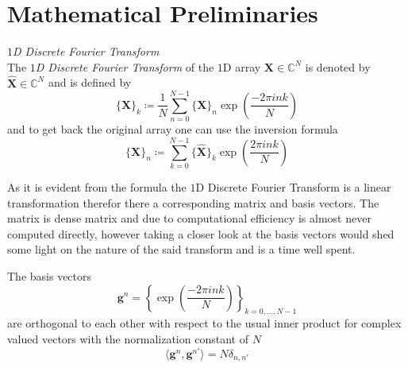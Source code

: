 \chapter{Mathematical Preliminaries}






\begin{Def}\label{def:1ddft}
    \emph{$1$D Discrete Fourier Transform}\\
    The \emph{$1$D Discrete Fourier Transform} of the $1$D array $\boldsymbol{X} \in \mathbb{C}^{N}$ is denoted by 
    $\hat {\boldsymbol{X}} \in \mathbb{C}^{N}$ and is defined by
    \begin{equation}\label{eq:1ddft}
        \{\hat {\boldsymbol{X}}\}_{k} \coloneqq \frac{1}{N}\sum_{n=0}^{N-1} \{{\boldsymbol{X}}\}_{n}\exp\left({\frac{-2\pi ink}{N}}\right)
    \end{equation}
    and to get back the original array one can use the inversion formula
    \begin{equation}\label{eq:1didft}
        \{{\boldsymbol{X}}\}_{n} \coloneqq \sum_{k=0}^{N-1}\{\hat {\boldsymbol{X}}\}_{k}\exp\left({\frac{2\pi ink}{N}}\right)
    \end{equation}    
\end{Def}

As it is evident from the formula the $1$D Discrete Fourier Transform is a linear transformation therefor 
there a corresponding matrix and basis vectors. The matrix is dense matrix and due to computational efficiency 
is almost never computed directly, however taking a closer look at the basis vectors would shed some light on 
the nature of the said transform and is a time well spent.

\begin{Prop}\label{Prop:1ddftbasisvectors}
    The basis vectors
    \begin{equation}\label{eq:1ddftbasisvectors}
        \boldsymbol{g}^n = \left\{\exp\left({\frac{-2\pi ink}{N}}\right)\right\}_{k=0,\ldots,N-1}
    \end{equation}
    are orthogonal to each other with respect to the usual inner product for complex valued vectors 
    with the normalization constant of $N$
    \begin{equation}
        \langle\boldsymbol{g}^n,\boldsymbol{g}^{n'}\rangle= N \delta_{n,n'}
    \end{equation}
\end{Prop}

